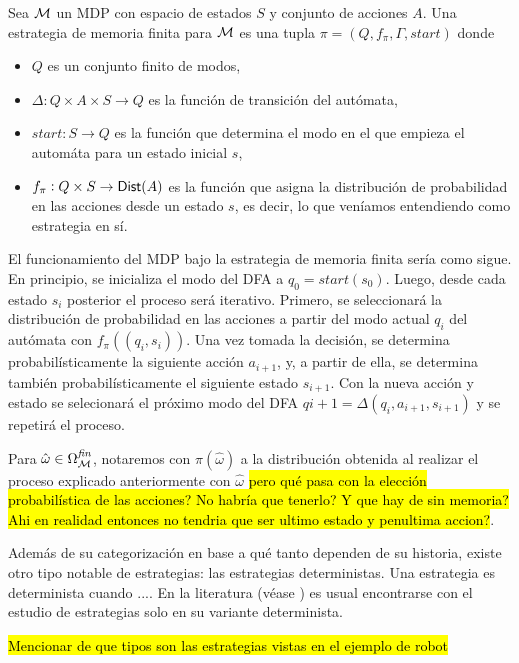 \begin{definition}
	Sea $\mathcal{M}$ un MDP con espacio de estados $S$ y conjunto de acciones $A$. Una estrategia de memoria finita para $\mathcal{M}$ es una tupla $\pi = (Q, f_\pi, \Gamma, start)$ donde
	\begin{itemize}
		\item $Q$ es un conjunto finito de modos,
		\item $\Delta : Q \times A \times S \rightarrow Q$ es la función de transición del autómata,
		\item $start: S \rightarrow Q$ es la función que determina el modo en el que empieza el automáta para un estado inicial $s$,
		\item $f_\pi : Q \times S \rightarrow \mathsf{Dist}(A)$ es la función que asigna la distribución de probabilidad en las acciones desde un estado $s$, es decir, lo que veníamos entendiendo como estrategia en sí.
	\end{itemize}
	El funcionamiento del MDP bajo la estrategia de memoria finita sería como sigue. En principio, se inicializa el modo del DFA a $q_0 = start(s_0)$. Luego, desde cada estado $s_i$ posterior el proceso será iterativo. Primero, se seleccionará la distribución de probabilidad en las acciones a partir del modo actual $q_i$ del autómata con $f_\pi((q_i,s_i))$. Una vez tomada la decisión, se determina probabilísticamente la siguiente acción $a_{i+1}$, y, a partir de ella, se determina también probabilísticamente el siguiente estado $s_{i+1}$. Con la nueva acción y estado se selecionará el próximo modo del DFA $q{i+1} = \Delta(q_i, a_{i+1}, s_{i+1})$ y se repetirá el proceso.

	Para $\hat \omega \in \Omega^{\textit{fin}}_{\mathcal{M}}$, notaremos con $\pi(\hat
		\omega)$ a la distribución obtenida al realizar el proceso explicado
	anteriormente con $\hat \omega$ \hl{pero qué pasa con la elección
		probabilística de las acciones? No habría que tenerlo? Y que hay de sin
		memoria? Ahi en realidad entonces no tendria que ser ultimo estado y penultima
		accion?}.
\end{definition}

Además de su categorización en base a qué tanto dependen de su historia, existe
otro tipo notable de estrategias: las estrategias deterministas. Una estrategia
es determinista cuando .... En la literatura (véase \cite{BaierKatoen}
\cite{AlfaroThesis}) es usual encontrarse con el estudio de estrategias solo en
su variante determinista.

\hl{Mencionar de que tipos son las estrategias vistas en el ejemplo de robot}

